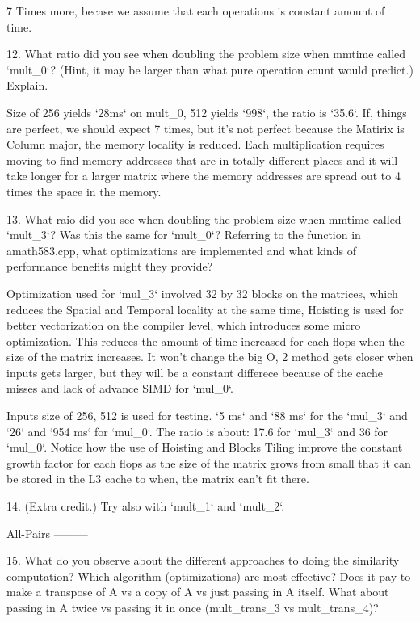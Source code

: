 \documentclass[]{article}
\begin{document}
7 Times more, becase we assume that each operations is constant amount of time. 

12.  What ratio did you see when doubling the problem size when mmtime called `mult_0`?  (Hint, it may be larger than what pure operation count would predict.)  Explain.

Size of 256 yields `28ms` on mult_0, 512 yields `998`, the ratio is `35.6`. If, things are perfect, we should expect 7 times, but it's not perfect because the Matirix is Column major, the memory locality is reduced. Each multiplication requires moving to find memory addresses that are in totally different places and it will take longer for a larger matrix where the memory addresses are spread out to 4 times the space in the memory.

13.  What raio did you see when doubling the problem size when mmtime called `mult_3`?  Was this the same for `mult_0`?  Referring to the function in amath583.cpp, what optimizations are implemented and what kinds of performance benefits might they provide?

Optimization used for `mul_3` involved 32 by 32 blocks on the matrices, which reduces the Spatial and Temporal locality at the same time, Hoisting is used for better vectorization on the compiler level, which introduces some micro optimization. This reduces the amount of time increased for each flops when the size of the matrix increases. It won't change the big O, 2 method gets closer when inputs gets larger, but they will be a constant differece because of the cache misses and lack of advance SIMD for `mul_0`. 

Inputs size of 256, 512 is used for testing. `5 ms` and `88 ms` for the `mul_3` and `26` and `954 ms` for `mul_0`. The ratio is about:  17.6 for `mul_3` and 36 for `mul_0`. Notice how the use of Hoisting and Blocks Tiling improve the constant growth factor for each flops as the size of the matrix grows from small that it can be stored in the L3 cache to when, the matrix can't fit there. 

14. (Extra credit.)  Try also with `mult_1` and `mult_2`.

All-Pairs
---------

15. What do you observe about the different approaches to doing the similarity computation?  Which algorithm (optimizations) are most effective?  Does it pay to make a transpose of A vs a copy of A vs just passing in A itself.  What about passing in A twice vs passing it in once (mult_trans_3 vs mult_trans_4)?
\end{document}
